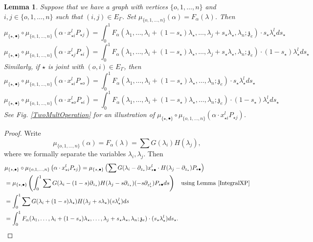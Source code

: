 \documentclass[11pt]{amsart}
\newtheorem{lem}[thm]{Lemma}
\theoremstyle{definition}
\theoremstyle{remark}
\numberwithin{equation}{section}
\begin{document}
\begin{lem}\label{IntegralS}
  Suppose that we have a graph with vertices $\{o,1,\dots,n\}$ and $i,j\in \{o,1,\dots,n\}$ such that $(i,j)\in
  E_{\Gamma}$. Set $\mu_{\{o,1,\dots, n\}}\left(\alpha\right)=F_{\alpha}(\lambda)$. Then
  $$
  \mu_{\{\star,\bullet\}}\circ \mu_{\{o,1,\dots, n\}}\left(\alpha\cdot x^l_{\star i}P_{\star j }\right)=\int^1_0 F_{\alpha}(\lambda_1,\dots,\lambda_i+(1-s_{\star})\lambda_{\star},\dots,\lambda_j+s_{\star}\lambda_{\star},\lambda_{n};\mathfrak{z}_e)\cdot s_{\star}\lambda^l_{\star}ds_{\star}
  $$
    $$
  \mu_{\{\star,\bullet\}}\circ \mu_{\{o,1,\dots, n\}}\left(\alpha\cdot x^l_{\star j}P_{\star i }\right)=\int^1_0 F_{\alpha}(\lambda_1,\dots,\lambda_i+(1-s_{\star})\lambda_{\star},\dots,\lambda_j+s_{\star}\lambda_{\star},\lambda_{n};\mathfrak{z}_e)\cdot(1-s_{\star})\lambda^l_{\star}ds_{\star}
  $$
  Similarly, if $\star$ is joint with $(o,i)\in E_{\Gamma}$, then
  $$
  \mu_{\{\star,\bullet\}}\circ \mu_{\{o,1,\dots, n\}}\left(\alpha\cdot x^l_{\star i}P_{\star o }\right)=\int^1_0 F_{\alpha}(\lambda_1,\dots,\lambda_i+(1-s_{\star})\lambda_{\star},\dots,\lambda_{n};\mathfrak{z}_e)\cdot s_{\star}\lambda^l_{\star}ds_{\star}
  $$
   $$
  \mu_{\{\star,\bullet\}}\circ \mu_{\{o,1,\dots, n\}}\left(\alpha\cdot x^l_{\star o}P_{\star i}\right)=\int^1_0 F_{\alpha}(\lambda_1,\dots,\lambda_i+(1-s_{\star})\lambda_{\star},\dots,\lambda_{n};\mathfrak{z}_e)\cdot(1-s_{\star})\lambda^l_{\star}ds_{\star}
  $$
  See Fig. \ref{TwoMultOperation} for an illustration of $\mu_{\{\star,\bullet\}}\circ \mu_{\{o,1,\dots, n\}}\left(\alpha\cdot x^l_{\star i}P_{\star j }\right)$.
\end{lem}
\begin{proof}
  Write
  $$
\mu_{\{o,1,\dots, n\}}\left(\alpha\right)=F_{\alpha}(\lambda)=\sum G(\lambda_i)H(\lambda_j),
  $$
where we formally separate the variables $\lambda_i,\lambda_j$. Then
  \begin{align*}
   &  \mu_{\{\star,\bullet\}}\circ \mu_{\{o,1,\dots, n\}}\left(\alpha\cdot x^l_{\star i}P_{\star j }\right)=  \mu_{\{\star,\bullet\}}\left(\sum G(\lambda_i-\partial_{z_{\star}})x^l_{\star\bullet}\cdot H(\lambda_j-\partial_{z_{\star}})P_{\star\bullet}\right)\\
     &=\mu_{\{\star,\bullet\}}\left(\int^1_0\sum G(\lambda_i-(1-s)\partial_{z_{\star}}) H(\lambda_j-s\partial_{z_{\star}})(-s\partial_{z^l_{\star}})P_{\star\bullet}ds\right)\quad \text{using Lemma \ref{IntegralXP}}\\
     &=\int^1_0\sum G(\lambda_i+(1-s)\lambda_{\star}) H(\lambda_j+s\lambda_{\star})(s\lambda^l_{\star})ds\\
     &=\int^1_0 F_{\alpha}(\lambda_1,\dots,\lambda_i+(1-s_{\star})\lambda_{\star},\dots,\lambda_j+s_{\star}\lambda_{\star},\lambda_{n};\mathfrak{z}_e)\cdot(s_{\star}\lambda^l_{\star})ds_{\star}.
  \end{align*}
\end{proof}
\end{document}
